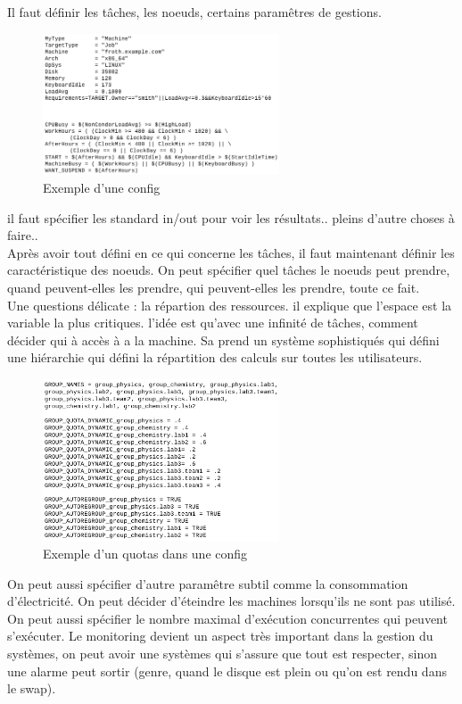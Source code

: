 \documentclass[oneside]{book}
\begin{document}
Il faut définir les tâches, les noeuds, certains paramêtres de gestions.\\

\begin{figure}[!ht]
\centering
\includegraphics[width = 7cm]{23.png}
\caption{Exemple d'une config}
\end{figure}

il faut spécifier les standard in/out pour voir les résultats.. pleins d'autre choses à faire..\\

Après avoir tout défini en ce qui concerne les tâches, il faut maintenant définir les caractéristique des noeuds. On peut spécifier quel tâches le noeuds peut prendre, quand peuvent-elles les prendre, qui peuvent-elles les prendre, toute ce fait.\\


Une questions délicate : la répartion des ressources. il explique que l'espace est la variable la plus critiques. l'idée est qu'avec une infinité de tâches, comment décider qui à accès à a la machine. Sa prend un système sophistiqués qui défini une hiérarchie qui défini la répartition des calculs sur toutes les utilisateurs.\\

\begin{figure}[!ht]
\centering
\includegraphics[width = 7cm]{quotas.png}
\caption{Exemple d'un quotas dans une config}
\end{figure}
On peut aussi spécifier d'autre paramêtre subtil comme la consommation d'électricité. On peut décider d'éteindre les machines lorsqu'ils ne sont pas utilisé. On peut aussi spécifier le nombre maximal d'exécution concurrentes qui peuvent s'exécuter. Le monitoring devient un aspect très important dans la gestion du systèmes, on peut avoir une systèmes qui s'assure que tout est respecter, sinon une alarme peut sortir (genre, quand le disque est plein ou qu'on est rendu dans le swap). \\
\end{document}
